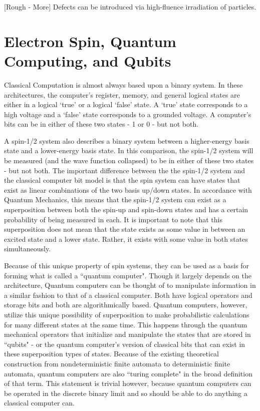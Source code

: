 \documentclass[oneside, astronomy, noacknowlegments]{BYUPhys}
\begin{document}
[Rough - More] Defects can be introduced via high-fluence irradiation of particles.

\section{Electron Spin, Quantum Computing, and Qubits}

Classical Computation is almost always based upon a binary system. In these architectures, the computer's register, memory, and general logical states are either in a logical `true' or a logical `false' state. A `true' state corresponds to a high voltage and a `false' state corresponds to a grounded voltage. A computer's bits can be in either of these two states - 1 or 0 - but not both.

A spin-1/2 system also describes a binary system between a higher-energy basis state and a lower-energy basis state. In this comparison, the spin-1/2 system will be measured (and the wave function collapsed) to be in either of these two states - but not both. The important difference between the the spin-1/2 system and the classical computer bit model is that the spin system can have states that exist as linear combinations of the two basis up/down states. In accordance with Quantum Mechanics, this means that the spin-1/2 system can exist as a superposition between both the spin-up and spin-down states and has a certain probability of being measured in each. It is important to note that this superposition does not mean that the state exists as some value in between an excited state and a lower state. Rather, it exists with some value in both states simultaneously.

Because of this unique property of spin systems, they can be used as a basis for forming what is called a ``quantum computer". Though it largely depends on the architecture, Quantum computers can be thought of to manipulate information in a similar fashion to that of a classical computer. Both have logical operators and storage bits and both are algorithmically based. Quantum computers, however, utilize this unique possibility of superposition to make probabilistic calculations for many different states at the same time. This happens through the quantum mechanical operators that initialize and manipulate the states that are stored in ``qubits" - or the quantum computer's version of classical bits that can exist in these superposition types of states. Because of the existing theoretical construction from nondeterministic finite automata to deterministic finite automata, quantum computers are also ``turing complete" in the broad definition of that term. This statement is trivial however, because quantum computers can be operated in the discrete binary limit and so should be able to do anything a classical computer can.
\end{document}
